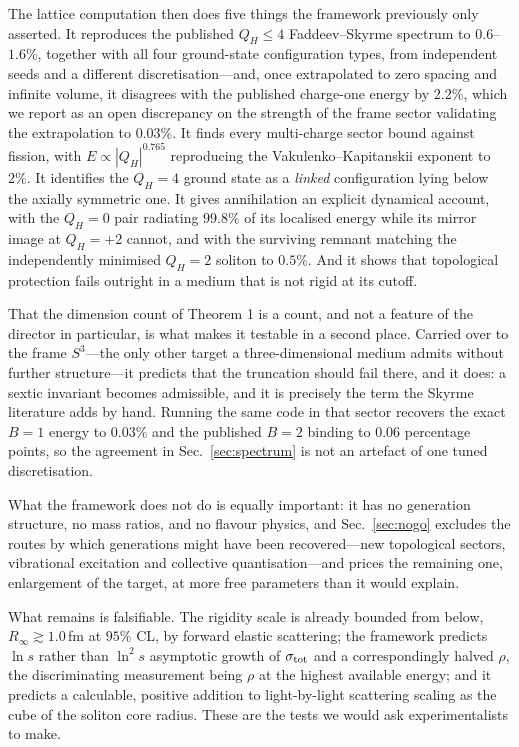 \documentclass[aps,prd,preprint,nofootinbib,longbibliography]{revtex4-2}
\newcommand{\Qh}{Q_H}
\begin{document}
The lattice computation then does five things the framework previously only
asserted. It reproduces the published $\Qh\le4$ Faddeev--Skyrme spectrum to
$0.6$--$1.6\%$, together with all four ground-state configuration types, from
independent seeds and a different discretisation---and, once extrapolated to zero
spacing and infinite volume, it disagrees with the published charge-one energy by
$2.2\%$, which we report as an open discrepancy on the strength of the frame
sector validating the extrapolation to $0.03\%$. It finds every
multi-charge sector bound against fission, with $E\propto|\Qh|^{0.765}$
reproducing the Vakulenko--Kapitanskii exponent to $2\%$. It identifies the
$\Qh=4$ ground state as a \emph{linked} configuration lying below the axially
symmetric one. It gives annihilation an explicit dynamical account, with the
$\Qh=0$ pair radiating $99.8\%$ of its localised energy while its mirror image at
$\Qh=+2$ cannot, and with the surviving remnant matching the independently
minimised $\Qh=2$ soliton to $0.5\%$. And it shows that topological protection
fails outright in a medium that is not rigid at its cutoff.

That the dimension count of Theorem 1 is a count, and not a feature of the
director in particular, is what makes it testable in a second place. Carried over
to the frame $S^3$---the only other target a three-dimensional medium admits
without further structure---it predicts that the truncation should fail there,
and it does: a sextic invariant becomes admissible, and it is precisely the term
the Skyrme literature adds by hand. Running the same code in that sector recovers
the exact $B=1$ energy to $0.03\%$ and the published $B=2$ binding to $0.06$
percentage points, so the agreement in Sec.~\ref{sec:spectrum} is not an artefact
of one tuned discretisation.

What the framework does not do is equally important: it has no generation
structure, no mass ratios, and no flavour physics, and Sec.~\ref{sec:nogo}
excludes the routes by which generations might have been recovered---new
topological sectors, vibrational excitation and collective quantisation---and
prices the remaining one, enlargement of the target, at more free parameters
than it would explain.

What remains is falsifiable. The rigidity scale is already bounded from below,
$R_\infty\gtrsim1.0\,$fm at $95\%$ CL, by forward elastic scattering; the framework
predicts $\ln s$ rather than $\ln^2 s$ asymptotic growth of $\sigma_{\rm tot}$
and a correspondingly halved $\rho$, the discriminating measurement being $\rho$
at the highest available energy; and it predicts a calculable, positive addition
to light-by-light scattering scaling as the cube of the soliton core radius.
These are the tests we would ask experimentalists to make.
\end{document}
